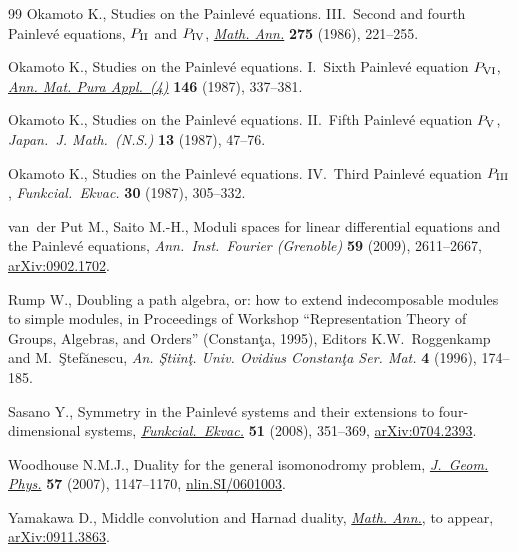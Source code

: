 \documentclass[pdftex]{sigma}
\numberwithin{equation}{section}
\theoremstyle{definition}
\begin{document}
\begin{thebibliography}{99}
Okamoto K.,
Studies on the Painlev\'e equations. III.~Second and fourth Painlev\'e equations, $P_{{\rm II}}$ and $P_{{\rm IV}}$,
\href{http://dx.doi.org/10.1007/BF01458459}{\emph{Math. Ann.}} \textbf{275} (1986), 221--255.

Okamoto K.,
Studies on the Painlev\'e equations. I.~Sixth Painlev\'e equation $P_{{\rm VI}}$,
\href{http://dx.doi.org/10.1007/BF01762370}{\emph{Ann. Mat. Pura Appl.~(4)}} \textbf{146} (1987), 337--381.

Okamoto K.,
Studies on the Painlev\'e equations. II.~Fifth {P}ainlev\'e equation $P_{\rm V}$,
\emph{Japan.~J. Math.~(N.S.)} \textbf{13} (1987), 47--76.

Okamoto K.,
Studies on the Painlev\'e equations. IV.~Third Painlev\'e equation $P_{{\rm III}}$,
\emph{Funkcial.\ Ekvac.} \textbf{30} (1987), 305--332.

van~der Put M., Saito M.-H.,
Moduli spaces for linear dif\/ferential equations
and the {P}ainlev\'e equations,
\emph{Ann.\ Inst.\ Fourier (Grenoble)} \textbf{59} (2009), 2611--2667,
\href{http://arxiv.org/abs/0902.1702}{arXiv:0902.1702}.

Rump W.,
Doubling a path algebra, or:
how to extend indecomposable modules to simple modules,
in Proceedings of Workshop
``Representation Theory of Groups, Algebras, and Orders''
(Constan{\c{t}}a, 1995),
Editors K.W.~Roggenkamp and M.~{\c{S}}tef{\u{a}}nescu,
\emph{An.  \c{S}tiin\c{t}. Univ. Ovidius Constan\c{t}a Ser. Mat.}
\textbf{4} (1996), 174--185.

Sasano Y.,
Symmetry in the Painlev\'e systems and
their extensions to four-dimensional systems,
\href{http://dx.doi.org/10.1619/fesi.51.351}{\emph{Funkcial.\ Ekvac.}} \textbf{51} (2008), 351--369,
\href{http://arxiv.org/abs/0704.2393}{arXiv:0704.2393}.

Woodhouse N.M.J.,
Duality for the general isomonodromy problem,
\href{http://dx.doi.org/10.1016/j.geomphys.2006.09.009}{\emph{J.~Geom. Phys.}} \textbf{57} (2007), 1147--1170,
\href{http://arxiv.org/abs/nlin.SI/0601003}{nlin.SI/0601003}.

Yamakawa D.,
Middle convolution and Harnad duality,
\href{http://dx.doi.org/10.1007/s00208-010-0517-3}{\emph{Math. Ann.}}, to appear,
\href{http://arxiv.org/abs/0911.3863}{arXiv:0911.3863}.

\end{thebibliography}\LastPageEnding
\end{document}
